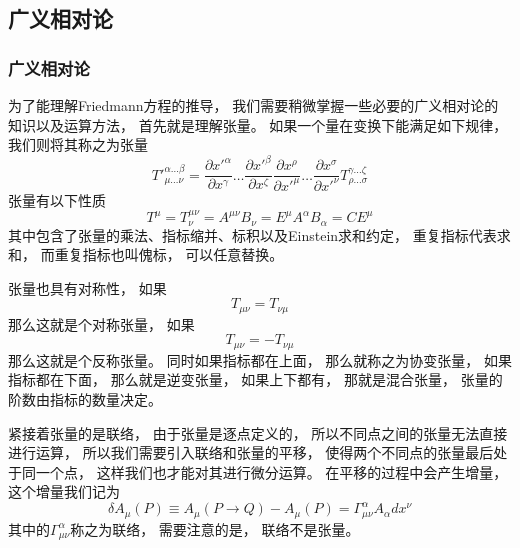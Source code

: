\documentclass[8pt]{beamer}
\begin{document}
    \subsection{广义相对论}
        \begin{frame}[fragile]
            \frametitle{广义相对论}
            \begin{multicols}{2} 
                \hypertarget{附录3}{}  
                \qquad
                为了能理解Friedmann方程的推导，
                我们需要稍微掌握一些必要的广义相对论的知识以及运算方法，
                首先就是理解张量。
                如果一个量在变换下能满足如下规律，
                我们则将其称之为张量
                $${T'}^{\alpha \dots\beta}_{\mu\dots\nu}=
                \frac{\partial x'^{\alpha}}{\partial x^{\gamma}}
                \dots
                \frac{\partial x'^{\beta}}{\partial x^{\zeta}}
                \frac{\partial x^{\rho}}{\partial x'^{\mu}}
                \dots
                \frac{\partial x^{\sigma}}{\partial x'^{\nu}}
                T^{\gamma\dots\zeta}_{\rho \dots\sigma }$$
                张量有以下性质
                $$T^{\mu}=T^{\mu\nu}_{\nu}=A^{\mu\nu}B_{\nu}=E^{\mu}A^{\alpha}B_{\alpha}=CE^{\mu}$$
                其中包含了张量的乘法、指标缩并、标积以及Einstein求和约定，
                重复指标代表求和，
                而重复指标也叫傀标，
                可以任意替换。
                
                \qquad
                张量也具有对称性，
                如果$$T_{\mu\nu}=T_{\nu\mu}$$
                那么这就是个对称张量，
                如果$$T_{\mu\nu}=-T_{\nu\mu}$$
                那么这就是个反称张量。
                同时如果指标都在上面，
                那么就称之为协变张量，
                如果指标都在下面，
                那么就是逆变张量，
                如果上下都有，
                那就是混合张量，
                张量的阶数由指标的数量决定。

                \qquad
                紧接着张量的是联络，
                由于张量是逐点定义的，
                所以不同点之间的张量无法直接进行运算，
                所以我们需要引入联络和张量的平移，
                使得两个不同点的张量最后处于同一个点，
                这样我们也才能对其进行微分运算。
                在平移的过程中会产生增量，
                这个增量我们记为
                $$\delta A_{\mu}(P)\equiv A_{\mu}(P\to Q)-A_{\mu}(P)=\varGamma ^{\alpha}_{\mu\nu}A_{\alpha}dx^{\nu}$$
                其中的$\varGamma ^{\alpha}_{\mu\nu}$称之为联络，
                需要注意的是，
                联络不是张量。
            \end{multicols}
        \end{frame}
\end{document}
